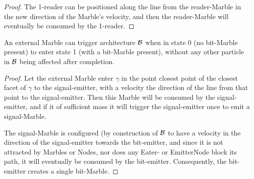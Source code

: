 \begin{proof}
    The 1-reader can be positioned along the line from the reader-Marble in the new direction of the Marble's velocity, 
    and then the reader-Marble will eventually be consumed by the 1-reader.
\end{proof}

\begin{lemma}
    An external Marble can trigger architecture $\mathcal{B}$ when in state 0 (no bit-Marble present) to enter state 1 (with a bit-Marble present), without any other particle in $\mathcal{B}$ being affected after completion.
    \label{lemma:writing}
\end{lemma}
\begin{proof}
    Let the external Marble enter $\gamma$ in the point closest point of the closest facet of $\gamma$ to the signal-emitter, with a velocity the direction of the line from that point to the signal-emitter. Then this Marble will be consumed by the signal-emitter, and if it of sufficient mass it will trigger the signal-emitter once to emit a signal-Marble.
    
    The signal-Marble is configured (by construction of $\mathcal{B}$ to have a velocity in the direction of the signal-emitter towards the bit-emitter, and since it is not attracted by Marbles or Nodes, nor does any Eater- or EmitterNode block its path, it will eventually be consumed by the bit-emitter. Consequently, the bit-emitter creates a single bit-Marble.
\end{proof}

